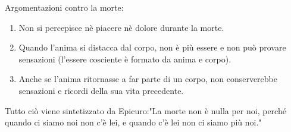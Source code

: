 \documentclass[10pt,a4paper]{article}
\begin{document}
	Argomentazioni contro la morte:
	\begin{enumerate}
		\item Non si percepisce nè piacere nè dolore durante la morte.
		\item Quando l'anima si distacca dal corpo, non è più essere e non può provare sensazioni (l'essere cosciente è formato da anima e corpo).
		\item Anche se l'anima ritornasse a far parte di un corpo, non conserverebbe sensazioni e ricordi della sua vita precedente.
	\end{enumerate} 
	Tutto ciò viene sintetizzato da Epicuro:"La morte non è nulla per noi, perché quando ci siamo noi non c'è lei, e quando c'è lei non ci siamo più noi."
	
	
\end{document}

